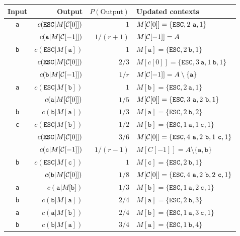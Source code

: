 \documentclass{article}
\begin{document}
\thispagestyle{empty}
\begin{tabular}{crrl}
  Input & Output & $P(\text{Output})$ & Updated contexts\\
  \hline
  {\tt a} & $c(\mathtt{ESC}|M[{\cal C}[0]])$ & $1$ & $M[{\cal C}[0]]=\{\mathtt{ESC},2~\mathtt{a},1\}$\\
  ~ & $c(\mathtt{a}|M[{\cal C}[-1]])$ & $1/(r+1)$ & $M[{\cal C}[-1]]=A$\\
  {\tt b} & $c(\mathtt{ESC}|M[\texttt{a}])$ & $1$ & $M[\mathtt{a}]=\{\mathtt{ESC},2~\mathtt{b},1\}$\\
  ~ & $c(\mathtt{ESC}|M[{\cal C}[0]])$ & $2/3$ & $M[c[0]]=\{\mathtt{ESC},3~\mathtt{a},1~\mathtt{b},1\}$\\
  ~ & $c(\mathtt{b}|M[{\cal C}[-1]])$ & $1/r$ & $M[{\cal C}[-1]]=A\setminus\{\mathtt{a}\}$ \\
  {\tt a} & $c(\mathtt{ESC}|M[\texttt{b}])$ & $1$ & $M[\mathtt{b}]=\{\mathtt{ESC},2~\mathtt{a},1\}$\\
 ~ & $c(\mathtt a|M[{\cal C}[0]])$ & $1/5$ & $M[{\cal C}[0]]=\{\mathtt{ESC},3~\mathtt{a},2~\mathtt{b},1\}$\\
  {\tt b} & $c(\mathtt b|M[\mathtt{a}])$ & $1/3$ & $M[\mathtt{a}]=\{\mathtt{ESC},2~\mathtt{b},2\}$\\
  {\tt c} & $c(\mathtt{ESC}|M[\mathtt{b}])$ & $1/2$ & $M[\mathtt{b}]=\{\mathtt{ESC},1~\mathtt{a},1~\mathtt{c},1\}$\\
  ~ & $c(\mathtt{ESC}|M[{\cal C}[0]])$ & $3/6$ & $M[{\cal C}[0]]=\{\mathtt{ESC},4~\mathtt{a},2~\mathtt{b},1~\mathtt{c},1\}$\\
  ~ & $c(\mathtt c|M[{\cal C}[-1]])$ & $1/(r-1)$ & $M[C[-1]]=A\setminus\{\mathtt{a},\mathtt{b}\}$\\
  {\tt b} & $c(\mathtt{ESC}|M[\texttt{c}])$ & $1$ & $M[\mathtt{c}]=\{\mathtt{ESC},2~\mathtt{b},1\}$\\
  ~ & $c(\mathtt b|M[{\cal C}[0]])$ & $1/8$ & $M[{\cal C}[0]]=\{\mathtt{ESC},4~\mathtt{a},2~\mathtt{b},2~\mathtt{c},1\}$\\
  {\tt a} & $c(\mathtt a|M[\mathtt{b]})$ & $1/3$ & $M[\mathtt{b}]=\{\mathtt{ESC},1~\mathtt{a},2~\mathtt{c},1\}$\\
  {\tt b} & $c(\mathtt b|M[\mathtt{a}])$ & $2/4$ & $M[\mathtt{a}]=\{\mathtt{ESC},2~\mathtt{b},3\}$\\
  {\tt a} & $c(\mathtt a|M[\mathtt{b}])$ & $2/4$ & $M[\mathtt{b}]=\{\mathtt{ESC},1~\mathtt{a},3~\mathtt{c},1\}$\\
  {\tt b} & $c(\mathtt b|M[\mathtt{a}])$ & $3/4$ & $M[\mathtt{a}]=\{\mathtt{ESC},1~\mathtt{b},4\}$\\

\end{tabular}
\end{document}
